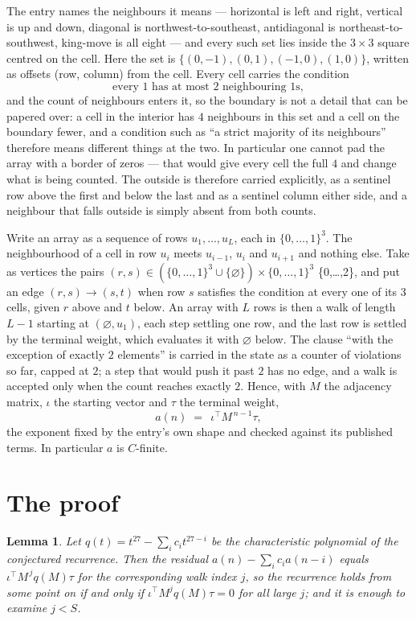 \documentclass[11pt,a4paper]{article}
\theoremstyle{plain}
\newtheorem{lemma}[theorem]{Lemma}
\theoremstyle{definition}
\begin{document}
The entry names the neighbours it means --- horizontal is left and right, vertical is up and
down, diagonal is northwest-to-southeast, antidiagonal is northeast-to-southwest, king-move is
all eight --- and every such set lies inside the $3\times3$ square centred on the cell. Here
the set is $\{(0,-1), (0,1), (-1,0), (1,0)\}$, written as offsets (row, column) from the cell. Every cell carries
the condition
\[
\text{every 1 has at most 2 neighbouring 1s},
\]
and the count of neighbours enters it, so the boundary is not a detail that can be papered
over: a cell in the interior has $4$ neighbours in this set and a cell on the boundary
fewer, and a condition such as ``a strict majority of its neighbours'' therefore means
different things at the two. In particular one cannot pad the array with a border of zeros ---
that would give every cell the full $4$ and change what is being counted. The outside is
therefore carried
explicitly, as a sentinel row above the first and below the last and as a sentinel column
either side, and a neighbour that falls outside is simply absent from both counts.

Write an array as a sequence of rows $u_1,\dots,u_L$, each in
$\{0,\dots,1\}^{3}$. The neighbourhood of a cell in row $u_i$ meets $u_{i-1}$,
$u_i$ and $u_{i+1}$ and nothing else. Take as vertices the pairs
$(r,s)\in(\{0,\dots,1\}^{3}\cup\{\varnothing\})\times\{0,\dots,1\}^{3}$ \times \{0,\dots,2\},
and put an edge $(r,s)\to(s,t)$ when row $s$ satisfies the condition at every one of its
$3$ cells, given $r$ above and $t$ below. An array with $L$ rows is then a walk of length
$L-1$ starting at $(\varnothing,u_1)$, each step settling one row, and the last row is
settled by the terminal weight, which evaluates it with $\varnothing$ below. The clause ``with the exception of exactly $2$ elements'' is carried in
the state as a counter of violations so far, capped at $2$; a step that would push it past
$2$ has no edge, and a walk is accepted only when the count reaches exactly $2$. Hence,
with $M$ the adjacency matrix, $\iota$ the starting vector and $\tau$ the terminal weight,
\[
a(n)\;=\;\,\iota^{\!\top}M^{\,n-1}\tau ,
\]
the exponent fixed by the entry's own shape and checked against its published terms. In
particular $a$ is $C$-finite.

\section{The proof}

\begin{lemma}\label{lem:crit}
Let $q(t)=t^{27}-\sum_i c_it^{27-i}$ be the characteristic polynomial of the
conjectured recurrence. Then the residual $a(n)-\sum_ic_ia(n-i)$ equals
$\iota^{\!\top}M^{\,j}q(M)\tau$ for the corresponding walk index $j$, so the
recurrence holds from some point on if and only if $\iota^{\!\top}M^{j}q(M)\tau=0$ for all
large $j$; and it is enough to examine $j<S$.
\end{lemma}
\end{document}
